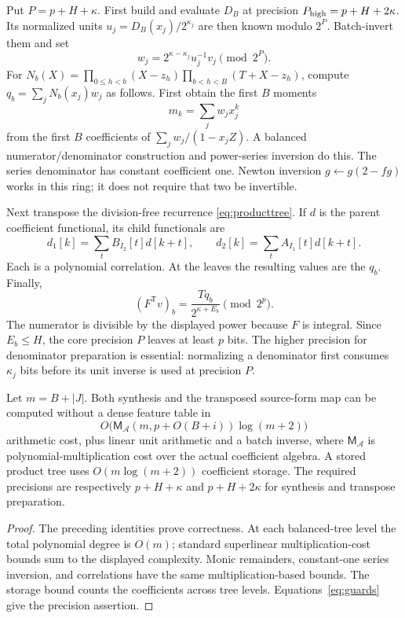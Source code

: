 Put $P=p+H+\kappa$. First build and evaluate $D_B$ at precision
$P_{\rm high}=p+H+2\kappa$. Its normalized units
$u_j=D_B(x_j)/2^{\kappa_j}$ are then known modulo $2^P$.
Batch-invert them and set
\[
 w_j=2^{\kappa-\kappa_j}u_j^{-1}v_j\pmod{2^P}.
\]
For $N_b(X)=\prod_{0\le h<b}(X-z_h)\prod_{b<h<B}(T+X-z_h)$, compute
$q_b=\sum_jN_b(x_j)w_j$ as follows. First obtain the first $B$ moments
\[
 m_k=\sum_jw_jx_j^k
\]
from the first $B$ coefficients of $\sum_jw_j/(1-x_jZ)$. A balanced
numerator/denominator construction and power-series inversion do this.
The series denominator has constant coefficient one. Newton inversion
$g\leftarrow g(2-fg)$ works in this ring; it does not require that two
be invertible.

Next transpose the division-free recurrence \eqref{eq:producttree}.
If $d$ is the parent coefficient functional, its child functionals are
\[
 d_1[k]=\sum_t B_{I_2}[t]d[k+t],\qquad
 d_2[k]=\sum_t A_{I_1}[t]d[k+t].
\]
Each is a polynomial correlation. At the leaves the resulting values
are the $q_b$. Finally,
\begin{equation}\label{eq:transposefinal}
 (F^{\mathsf T}v)_b=\frac{Tq_b}{2^{\kappa+E_b}}\pmod{2^p}.
\end{equation}
The numerator is divisible by the displayed power because $F$ is
integral. Since $E_b\le H$, the core precision $P$ leaves at least $p$
bits. The higher precision for denominator preparation is essential:
normalizing a denominator first consumes $\kappa_j$ bits before its
unit inverse is used at precision $P$.

\begin{theorem}\label{thm:transform}
Let $m=B+|J|$. Both synthesis and the transposed source-form map can be
computed without a dense feature table in
\[
 O\bigl(\mathsf M_{\mathcal A}(m,p+O(B+i))\log(m+2)\bigr)
\]
arithmetic cost, plus linear unit arithmetic and a batch inverse, where
$\mathsf M_{\mathcal A}$ is polynomial-multiplication cost over the actual
coefficient algebra. A stored product tree uses $O(m\log(m+2))$
coefficient storage. The required precisions are respectively
$p+H+\kappa$ and $p+H+2\kappa$ for synthesis and transpose preparation.
\end{theorem}
\begin{proof}
The preceding identities prove correctness. At each balanced-tree level
the total polynomial degree is $O(m)$; standard superlinear
multiplication-cost bounds sum to the displayed complexity. Monic
remainders, constant-one series inversion, and correlations have the
same multiplication-based bounds. The storage bound counts the
coefficients across tree levels. Equations~\eqref{eq:guards} give the
precision assertion.
\end{proof}

